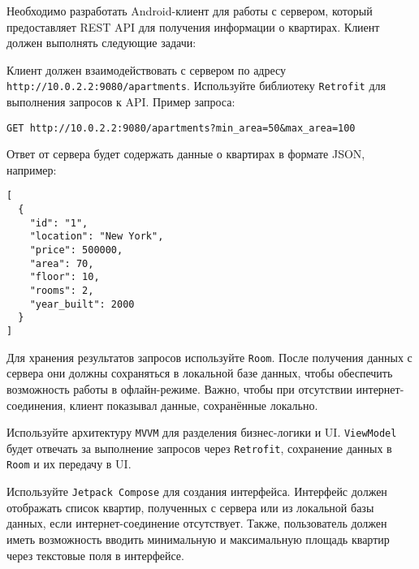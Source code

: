
Необходимо разработать Android-клиент для работы с сервером, который предоставляет REST API для получения информации о квартирах. Клиент должен выполнять следующие задачи:

Клиент должен взаимодействовать с сервером по адресу \texttt{http://10.0.2.2:9080/apartments}. Используйте библиотеку \texttt{Retrofit} для выполнения запросов к API. Пример запроса:

\begin{verbatim}
GET http://10.0.2.2:9080/apartments?min_area=50&max_area=100
\end{verbatim}

Ответ от сервера будет содержать данные о квартирах в формате JSON, например:

\begin{verbatim}
[
  {
    "id": "1",
    "location": "New York",
    "price": 500000,
    "area": 70,
    "floor": 10,
    "rooms": 2,
    "year_built": 2000
  }
]
\end{verbatim}

Для хранения результатов запросов используйте \texttt{Room}. После получения данных с сервера они должны сохраняться в локальной базе данных, чтобы обеспечить возможность работы в офлайн-режиме. Важно, чтобы при отсутствии интернет-соединения, клиент показывал данные, сохранённые локально.

Используйте архитектуру \texttt{MVVM} для разделения бизнес-логики и UI. \texttt{ViewModel} будет отвечать за выполнение запросов через \texttt{Retrofit}, сохранение данных в \texttt{Room} и их передачу в UI.

Используйте \texttt{Jetpack Compose} для создания интерфейса. Интерфейс должен отображать список квартир, полученных с сервера или из локальной базы данных, если интернет-соединение отсутствует. Также, пользователь должен иметь возможность вводить минимальную и максимальную площадь квартир через текстовые поля в интерфейсе.

